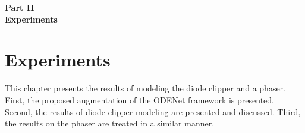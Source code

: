 \cleardoublepage
\thispagestyle{empty}
\begin{center}
\vspace*{3cm}
{\huge \bf Part II}\\ \vspace*{1cm}
{\Huge \bf Experiments}\\\vspace*{0.2cm}
\begin{figure}[ht]
\centering
\vspace{2cm}
\scalebox{1.2}{}
\end{figure}
\end{center}
\label{par:part2}
\newpage
\quad
\thispagestyle{empty}
\newpage
\chapter{Experiments}
\label{chapter:experiments}

This chapter presents the results of modeling the diode clipper and a phaser. First, the proposed augmentation of the ODENet framework is presented. Second, the results of diode clipper modeling are presented and discussed. Third, the results on the phaser are treated in a similar manner.




